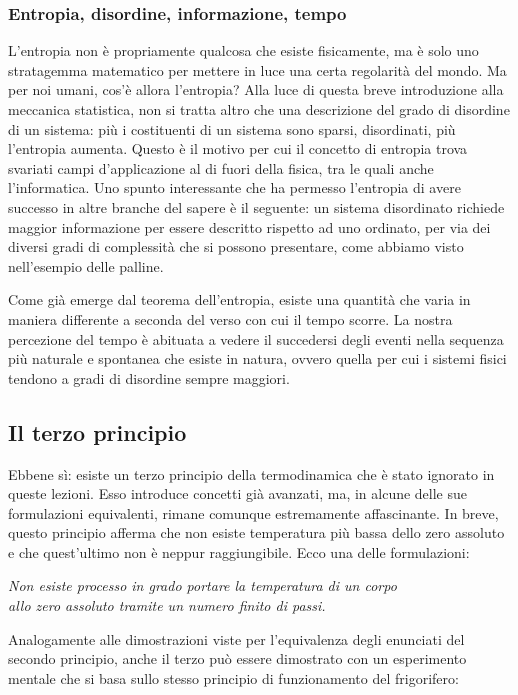 \subsubsection*{Entropia, disordine, informazione, tempo}
L'entropia non è propriamente qualcosa che esiste fisicamente,
ma è solo uno stratagemma matematico per mettere in luce una
certa regolarità del mondo.
Ma per noi umani, cos'è allora l'entropia? Alla luce di questa breve introduzione
alla meccanica statistica, non si tratta altro che una descrizione
del grado di disordine di un sistema: più i costituenti di un
sistema sono sparsi, disordinati, più l'entropia aumenta. Questo
è il motivo per cui il concetto di entropia trova svariati campi
d'applicazione al di fuori della fisica, tra le quali anche
l'informatica. Uno spunto interessante che ha permesso l'entropia
di avere successo in altre branche del sapere è il seguente: un
sistema disordinato richiede maggior informazione per essere
descritto rispetto ad uno ordinato, per via dei diversi gradi
di complessità che si possono presentare, come abbiamo visto
nell'esempio delle palline.

Come già emerge dal teorema dell'entropia, esiste una quantità
che varia in maniera differente a seconda del verso con cui il
tempo scorre. La nostra percezione del tempo è abituata a vedere
il succedersi degli eventi nella sequenza più naturale e spontanea
che esiste in natura, ovvero quella per cui i sistemi fisici tendono
a gradi di disordine sempre maggiori.

\subsection{Il terzo principio}
Ebbene sì: esiste un terzo principio della termodinamica che è stato
ignorato in queste lezioni. Esso introduce concetti già avanzati, ma,
in alcune delle sue formulazioni equivalenti, rimane comunque estremamente
affascinante. In breve, questo principio afferma che non esiste
temperatura più bassa dello zero assoluto e che quest'ultimo non è
neppur raggiungibile. Ecco una delle formulazioni:

\begin{center}
    \textit{Non esiste processo in grado portare la temperatura di un corpo\\allo
    zero assoluto tramite un numero finito di passi.}
\end{center}

\noindent Analogamente alle dimostrazioni viste per l'equivalenza
degli enunciati del secondo principio, anche il terzo può essere
dimostrato con un esperimento mentale che si basa sullo stesso principio
di funzionamento del frigorifero:

